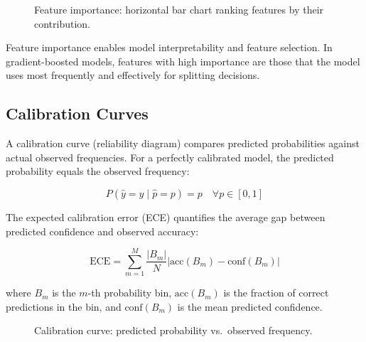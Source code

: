 \documentclass[10pt,a4paper]{article}
\begin{document}
\begin{figure}[H]
    \centering
    \caption{Feature importance: horizontal bar chart ranking features by their contribution.}
    \label{fig:feature-importance}
\end{figure}

Feature importance enables model interpretability and feature selection. In gradient-boosted models, features with high importance are those that the model uses most frequently and effectively for splitting decisions.

\subsection{Calibration Curves}
\label{sec:calibration}

A calibration curve (reliability diagram) compares predicted probabilities against actual observed frequencies. For a perfectly calibrated model, the predicted probability equals the observed frequency:

\begin{equation}
P(\hat{y} = y \mid \hat{p} = p) = p \quad \forall p \in [0, 1]
\label{eq:perfect-calibration}
\end{equation}

The expected calibration error (ECE) quantifies the average gap between predicted confidence and observed accuracy:

\begin{equation}
\text{ECE} = \sum_{m=1}^{M} \frac{|B_m|}{N} | \text{acc}(B_m) - \text{conf}(B_m) |
\label{eq:ece}
\end{equation}

where $B_m$ is the $m$-th probability bin, $\text{acc}(B_m)$ is the fraction of correct predictions in the bin, and $\text{conf}(B_m)$ is the mean predicted confidence.

\begin{figure}[H]
    \centering
    \caption{Calibration curve: predicted probability vs.\ observed frequency.}
    \label{fig:calibration-curve}
\end{figure}
\end{document}
